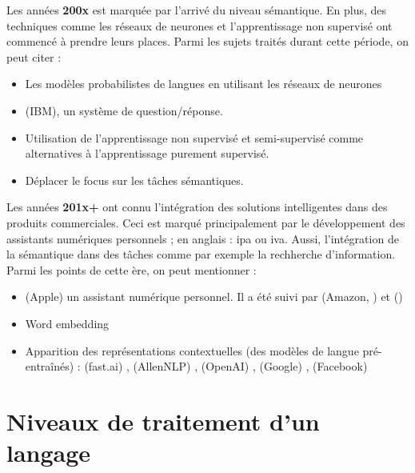 \documentclass{KodeBook}
\begin{document}
Les années \textbf{200x} est marquée par l'arrivé du niveau sémantique. 
En plus, des techniques comme les réseaux de neurones et l'apprentissage non supervisé ont commencé à prendre leurs places.
Parmi les sujets traités durant cette période, on peut citer :
\begin{itemize}
	\item {} Les modèles probabilistes de langues en utilisant les réseaux de neurones \cite{2003-bengio-al}
	\item {}  (IBM), un système de question/réponse.
	\item Utilisation de l'apprentissage non supervisé et semi-supervisé comme alternatives à l'apprentissage purement supervisé.
	\item Déplacer le focus sur les tâches sémantiques.
\end{itemize}

Les années \textbf{201x+} ont connu l'intégration des solutions intelligentes dans des produits commerciales.
Ceci est marqué principalement par le développement des assistants numériques personnels ; en anglais : \ac{ipa} ou \ac{iva}.
Aussi, l'intégration de la sémantique dans des tâches comme par exemple la rechherche d'information. 
Parmi les points de cette ère, on peut mentionner :
\begin{itemize}
	\item {}  (Apple)  un assistant numérique personnel. Il a été suivi par  (Amazon, ) et  ()
	\item {} Word embedding \cite{2014-lebret-collobert}
	\item {} Apparition des représentations contextuelles (des modèles de langue pré-entraînés) :  (fast.ai) \cite{2018-howard-ruder},  (AllenNLP) \cite{2018-peters-al},  (OpenAI) \cite{2018-radford-al},  (Google) \cite{2018-devlin-al},  (Facebook) \cite{2019-lample-conneau}
\end{itemize}

\section{Niveaux de traitement d'un langage}
\end{document}
